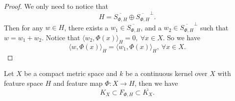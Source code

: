 \begin{proof}
	We only need to notice that
	\begin{equation}
	H = \overline{S_{\Phi,H}} \oplus \overline{S_{\Phi,H}}^{\perp}.
	\end{equation} 
	Then for any $w\in H$, there exists a $w_1 \in \overline{S_{\Phi,H}}$, and a $w_2 \in \overline{S_{\Phi,H}}^{\perp}$ such that $w = w_1 + w_2$. Notice that $\langle w_2, \Phi(x) \rangle_H = 0,~\forall x\in X$. So we have
	\begin{equation}
		\langle w, \Phi(x) \rangle_H = \langle w_1, \Phi(x) \rangle_H,~\forall x \in X.
	\end{equation}
\end{proof}


%

\begin{lemma}
	Let $X$ be a compact metric space and $k$ be a continuous kernel over $X$ with feature space $H$ and feature map $\Phi: X\rightarrow H$, then we have
	\begin{equation}
	K_X \subset F_{\Phi,H} \subset \overline{K_X}.
	\end{equation}
\end{lemma}


